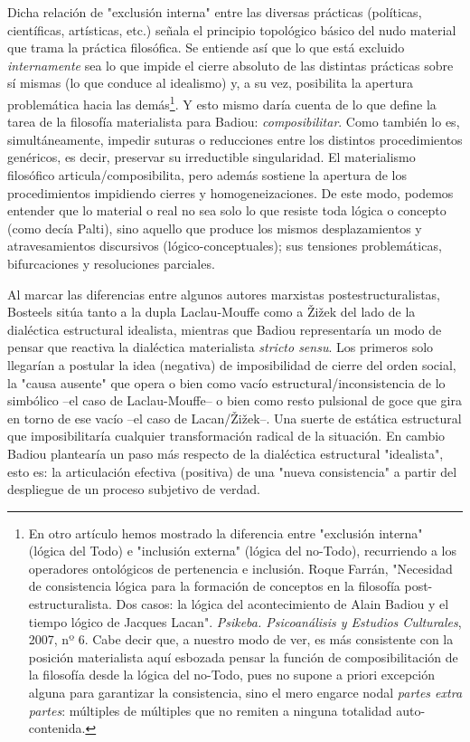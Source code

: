 Dicha relación de "exclusión interna" entre las diversas prácticas
(políticas, científicas, artísticas, etc.) señala el principio
topológico básico del nudo material que trama la práctica filosófica. Se
entiende así que lo que está excluido \emph{internamente} sea lo que
impide el cierre absoluto de las distintas prácticas sobre sí mismas (lo
que conduce al idealismo) y, a su vez, posibilita la apertura
problemática hacia las demás\footnote{En otro artículo hemos mostrado la
  diferencia entre "exclusión interna" (lógica del Todo) e "inclusión
  externa" (lógica del no-Todo), recurriendo a los operadores
  ontológicos de pertenencia e inclusión. Roque Farrán, "Necesidad de
  consistencia lógica para la formación de conceptos en la filosofía
  post-estructuralista. Dos casos: la lógica del acontecimiento de Alain
  Badiou y el tiempo lógico de Jacques Lacan". \emph{Psikeba.
  Psicoanálisis y Estudios Culturales}, 2007, nº 6. Cabe decir que, a
  nuestro modo de ver, es más consistente con la posición materialista
  aquí esbozada pensar la función de composibilitación de la filosofía
  desde la lógica del no-Todo, pues no supone a priori excepción alguna
  para garantizar la consistencia, sino el mero engarce nodal
  \emph{partes extra partes}: múltiples de múltiples que no remiten a
  ninguna totalidad auto-contenida.}. Y esto mismo daría cuenta de lo
que define la tarea de la filosofía materialista para Badiou:
\emph{composibilitar}. Como también lo es, simultáneamente, impedir
suturas o reducciones entre los distintos procedimientos genéricos, es
decir, preservar su irreductible singularidad. El materialismo
filosófico articula/composibilita, pero además sostiene la apertura de
los procedimientos impidiendo cierres y homogeneizaciones. De este modo,
podemos entender que lo material o real no sea solo lo que resiste toda
lógica o concepto (como decía Palti), sino aquello que produce los
mismos desplazamientos y atravesamientos discursivos
(lógico-conceptuales); sus tensiones problemáticas, bifurcaciones y
resoluciones parciales.

Al marcar las diferencias entre algunos autores marxistas
postestructuralistas, Bosteels sitúa tanto a la dupla Laclau-Mouffe como
a Žižek del lado de la dialéctica estructural idealista, mientras que
Badiou representaría un modo de pensar que reactiva la dialéctica
materialista \emph{stricto sensu}. Los primeros solo llegarían a
postular la idea (negativa) de imposibilidad de cierre del orden social,
la "causa ausente" que opera o bien como vacío
estructural/inconsistencia de lo simbólico --el caso de Laclau-Mouffe--
o bien como resto pulsional de goce que gira en torno de ese vacío --el
caso de Lacan/Žižek--. Una suerte de estática estructural que
imposibilitaría cualquier transformación radical de la situación. En
cambio Badiou plantearía un paso más respecto de la dialéctica
estructural "idealista", esto es: la articulación efectiva (positiva) de
una "nueva consistencia" a partir del despliegue de un proceso subjetivo
de verdad.

